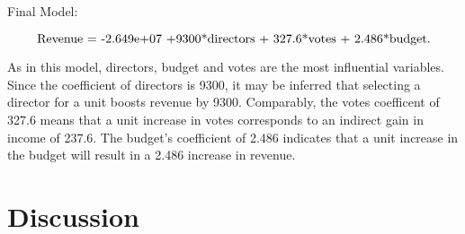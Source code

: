 \documentclass[12pt]{article}
\begin{document}
Final Model: 

\begin{equation}
$Revenue = -2.649e+07 +9300*directors + 327.6*votes + 2.486*budget$.
\end{equation}

As in this model, directors, budget and votes are the most influential variables.
Since the coefficient of directors is 9300, it may be inferred that selecting a 
director for a unit boosts revenue by 9300. Comparably, the votes coefficent of 
327.6 means that a unit increase in votes corresponds to an indirect gain in income 
of 237.6. The budget's coefficient of 2.486 indicates that a unit increase in the 
budget will result in a 2.486 increase in revenue.



\section{Discussion}
\label{sec:dis}





\end{document}
